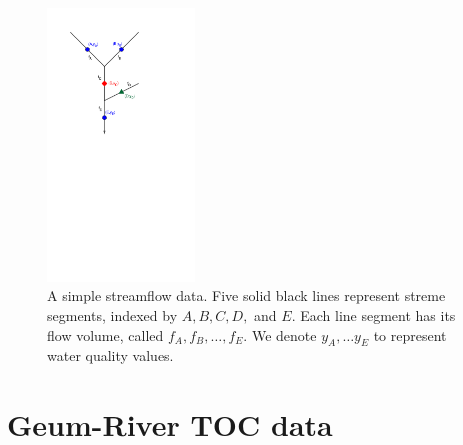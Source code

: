 \documentclass[11pt,titlepage]{article}
\begin{document}
\begin{figure}
	\centering\includegraphics[width=0.35\textwidth]{Stream_result/Node-flow-complexed2-3.pdf}
	\vspace{-6mm}
	\caption{A simple streamflow data. Five solid black lines represent streme segments,  indexed by $A,B,C,D,$ and $E$. Each line segment has its flow volume, called $f_{A}, f_{B}, \ldots, f_E$. We denote $y_{A}, \ldots y_{E}$ to represent water quality values. }%
	\label{fig:nodedescription}
\end{figure}


\section{Geum-River TOC data}\label{sec:data}
\end{document}
